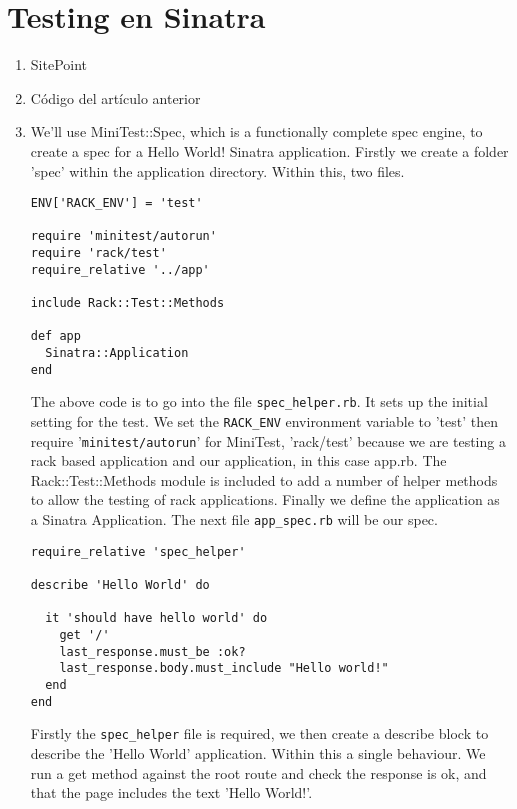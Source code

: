 \chapter{Testing en Sinatra}
\begin{enumerate}
\item 
{} SitePoint
\item  Código del artículo anterior
\item
{}

We'll use MiniTest::Spec, which is a functionally complete spec engine, to create a spec for a Hello World! Sinatra application. Firstly we create a folder 'spec' within the application directory. Within this, two files.


\begin{verbatim}
ENV['RACK_ENV'] = 'test'

require 'minitest/autorun'
require 'rack/test'
require_relative '../app'

include Rack::Test::Methods

def app
  Sinatra::Application
end
\end{verbatim}

The above code is to go into the file \verb|spec_helper.rb|. It sets up the initial setting for the test. We set the \verb|RACK_ENV| environment variable to 'test' then require '\verb|minitest/autorun|' for MiniTest, 'rack/test' because we are testing a rack based application and our application, in this case app.rb. The Rack::Test::Methods module is included to add a number of helper methods to allow the testing of rack applications. Finally we define the application as a Sinatra Application.
The next file \verb|app_spec.rb| will be our spec.
\begin{verbatim}
require_relative 'spec_helper'

describe 'Hello World' do

  it 'should have hello world' do
    get '/'
    last_response.must_be :ok?
    last_response.body.must_include "Hello world!"
  end
end
\end{verbatim}
Firstly the \verb|spec_helper| file is required, we then create a describe block to describe the 'Hello World' application. Within this a single behaviour. We run a get method against the root route and check the response is ok, and that the page includes the text 'Hello World!'.
\end{enumerate}

